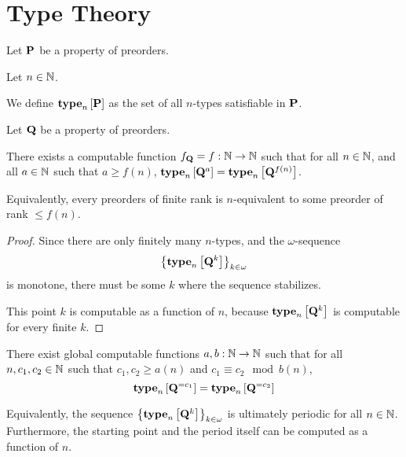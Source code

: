 \section{Type Theory}
\begin{definition}
    Let $\mathbf{P}$ be a property of preorders.

    Let $n \in \mathbb{N}$.

    We define $\mathbf{type}_{n} \left[ {\mathbf{P}} \right]$ as the set of all
    $n$-types satisfiable in $\mathbf{P}$.
\end{definition}

\begin{lemma}\label{f-lemma}
    Let $\mathbf{Q}$ be a property of preorders.

    There exists a computable function $f_{\mathbf{Q}} = f: \mathbb{N} \to \mathbb{N}$ such that
    for all $n \in \mathbb{N}$, and all $a \in \mathbb{N}$ such that $a \ge f(n)$,
    $\mathbf{type}_{n} \left[ {\mathbf{Q}^{a}} \right] = \mathbf{type}_{n} \left[ {\mathbf{Q}^{f(n)}} \right]$.

    Equivalently, every preorders of finite rank is $n$-equivalent to some preorder of rank $\le f(n)$.
\end{lemma}

\begin{proof}
    Since there are only finitely many $n$-types,
    and the $\omega$-sequence \[\left\{ {\mathbf{type}_{n} \left[ {\mathbf{Q}^{k}} \right]} \right\}_{k \in \omega}\]
    is monotone,
    there must be some $k$ where the sequence stabilizes.

    This point $k$ is computable as a function of $n$, because
    $\mathbf{type}_{n} \left[ {\mathbf{Q}^{k}} \right]$ is computable for every finite $k$.
\end{proof}

\begin{lemma}\label{ab-lemma}
    There exist global computable functions $a, b : \mathbb{N} \to \mathbb{N}$ such that
    for all $n, c_1, c_2 \in \mathbb{N}$ such that $c_1, c_2 \ge a(n)$ and $c_1 \equiv c_2 \mod b(n)$,
    \[\mathbf{type}_{n} \left[ {\mathbf{Q}^{= c_1}} \right] = \mathbf{type}_{n} \left[ {\mathbf{Q}^{= c_2}} \right]\]

    Equivalently, the sequence $\left\{ {\mathbf{type}_{n} \left[ {\mathbf{Q}^{k}} \right]} \right\}_{k \in \omega}$
    is ultimately periodic for all $n \in \mathbb{N}$. Furthermore, the starting point and the period
    itself can be computed as a function of $n$.
\end{lemma}

